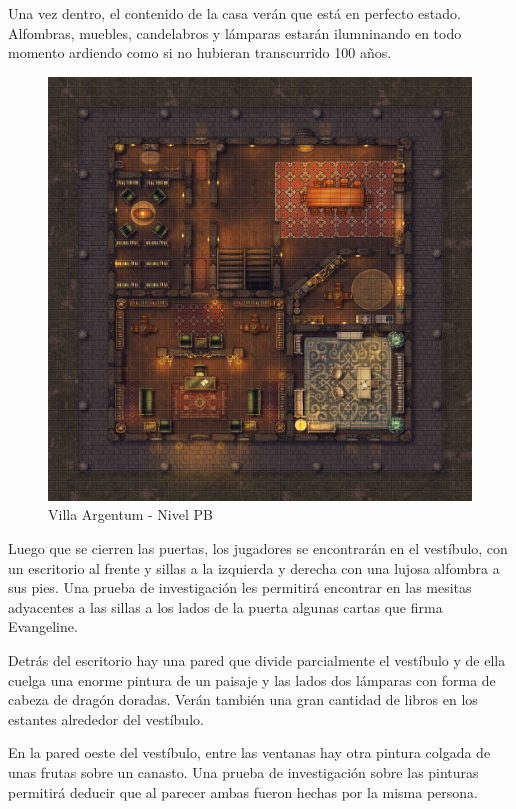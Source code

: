 \documentclass[10pt,twoside,twocolumn,openany]{dndbook}
\begin{document}
Una vez dentro, el contenido de la casa verán que está en perfecto estado. Alfombras, muebles, 
candelabros y lámparas estarán ilumninando en todo momento ardiendo como si no hubieran 
transcurrido 100 años.

\begin{figure}
  \centering
  \includegraphics[width=\columnwidth]{maps/villa-argentum-pb.jpg}
  \caption{Villa Argentum - Nivel PB}
  \label{fig:vapb}
\end{figure}



Luego que se cierren las puertas, los jugadores se encontrarán en el vestíbulo, con un escritorio 
al frente y sillas a la izquierda y derecha con una lujosa alfombra a sus pies. Una prueba de 
investigación les permitirá encontrar en las mesitas adyacentes a las sillas a los lados de la 
puerta algunas cartas que firma Evangeline.

Detrás del escritorio hay una pared que divide parcialmente el vestíbulo y de ella cuelga una 
enorme pintura de un paisaje y las lados dos lámparas con forma de cabeza de dragón doradas.
Verán también una gran cantidad de libros en los estantes alrededor del vestíbulo.

En la pared oeste del vestíbulo, entre las ventanas hay otra pintura colgada de unas frutas sobre 
un canasto. Una prueba de investigación sobre las pinturas permitirá deducir que al parecer ambas 
fueron hechas por la misma persona.
\end{document}
